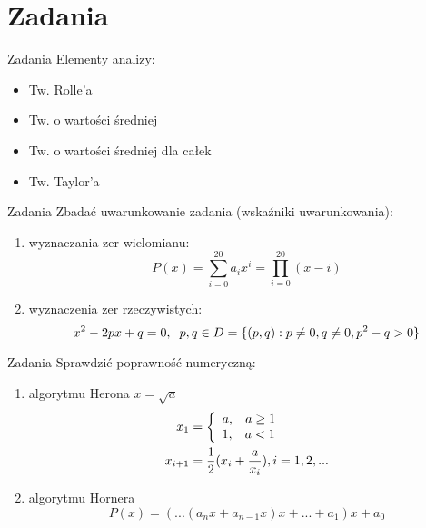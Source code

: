 \section{Zadania}
\begin{frame}{Zadania}
	Elementy analizy:
    \begin{itemize}
    	\item Tw. Rolle'a
        \item Tw. o wartości średniej
        \item Tw. o wartości średniej dla całek
        \item Tw. Taylor'a
    \end{itemize}
\end{frame}
\begin{frame}{Zadania}
	Zbadać uwarunkowanie zadania (wskaźniki uwarunkowania):
    \begin{enumerate}
    	\item wyznaczania zer wielomianu: \[
				P(x) = \sum_{i=0}^{20} a_i x^i = \prod_{i=0}^{20} (x-i)
            \]
        \item wyznaczenia zer rzeczywistych: \[
        		x^2 - 2px + q = 0, \hspace{.2cm} p, q \in D = \{ 
                	(p, q): p \neq 0, q \neq 0, p^2 - q > 0
                \}
        	\]
    \end{enumerate}
\end{frame}
\begin{frame}{Zadania}
	Sprawdzić poprawność numeryczną:
    \begin{enumerate}
    	\item algorytmu Herona $x = \sqrt{a}$
        	\begin{align*}
                x_1 &= \left\{
                    \begin{array}{ll}
                        a, \hspace{.3cm} a \ge 1 \\
                        1, \hspace{.3cm} a < 1
                    \end{array}
                \right. \\ 
                x_{i+1} &= \frac{1}{2}(x_i + \frac{a}{x_i}), i=1, 2, ...
        	\end{align*}
        \item algorytmu Hornera \[
        	P(x) = (...(a_n x + a_{n-1} x)x + ... + a_1) x + a_0
        \]
    \end{enumerate}
\end{frame}
